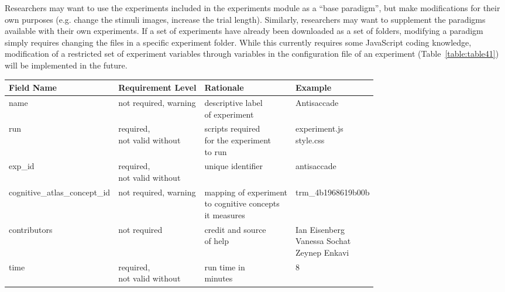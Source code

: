 \documentclass{report}
\begin{document}
Researchers may want to use the experiments included in the experiments
module as a ``base paradigm'', but make modifications for their own
purposes (e.g. change the stimuli images, increase the trial length).
Similarly, researchers may want to supplement the paradigms available
with their own experiments. If a set of experiments have already been
downloaded as a set of folders, modifying a paradigm simply requires
changing the files in a specific experiment folder. While this currently
requires some JavaScript coding knowledge, modification of a restricted
set of experiment variables through variables in the configuration file
of an experiment (Table~\ref{table:table41}) will be implemented in the future. \newline

\begin{table}[h!]
\centering
\begin{tabular}{ | l | l | l | p{3cm} |}
    \hline
    \textbf{Field Name} & \textbf{Requirement Level} & \textbf{Rationale} & \textbf{Example} \\ \hline
    name & not required, warning & \shortstack[l]{descriptive label\\ of experiment} & Antisaccade \\ \hline
    run & \shortstack[l]{required,\\ not valid without} & \shortstack[l]{scripts required \\ for the experiment \\ to run } & \shortstack[l]{experiment.js \\ style.css } \\ \hline     
    exp\_id & \shortstack[l]{required,\\ not valid without} & unique identifier & antisaccade \\ \hline
    cognitive\_atlas\_concept\_id & not required, warning & \shortstack[l]{mapping of experiment \\ to cognitive concepts \\ it measures} & trm\_4b1968619b00b \\ \hline
    contributors & not required & \shortstack[l]{credit and source \\ of help} & \shortstack[l]{Ian Eisenberg \\ Vanessa Sochat \\ Zeynep Enkavi} \\ \hline
    time & \shortstack[l]{required,\\ not valid without} & \shortstack[l]{run time in \\ minutes} & 8 \\ \hline

\end{tabular}
\end{table}
\end{document}
